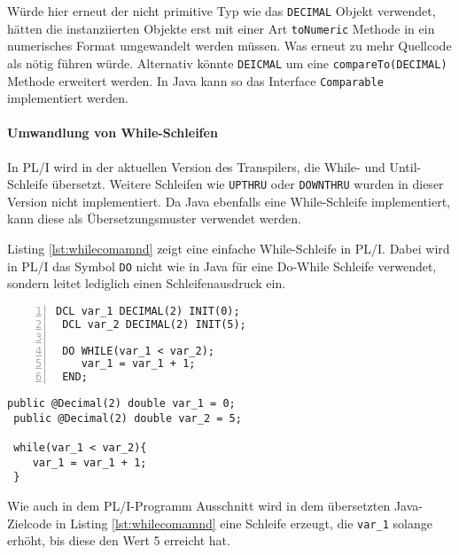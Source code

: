 Würde hier erneut der nicht primitive Typ wie das \verb+DECIMAL+ Objekt verwendet, hätten die instanziierten Objekte erst mit einer Art \verb+toNumeric+ Methode in ein numerisches Format umgewandelt werden müssen. Was erneut zu mehr Quellcode als nötig führen würde. Alternativ könnte \verb+DEICMAL+ um eine \verb+compareTo(DECIMAL)+ Methode erweitert werden. In Java kann so das Interface \verb+Comparable+ implementiert werden. 

\paragraph*{Umwandlung von While-Schleifen}
In PL/I wird in der aktuellen Version des Transpilers, die  While- und Until-Schleife übersetzt.
Weitere Schleifen wie \verb+UPTHRU+ oder \verb+DOWNTHRU+ wurden in dieser Version nicht implementiert.
Da Java ebenfalls eine While-Schleife implementiert, kann diese als Übersetzungsmuster verwendet werden. 


Listing \ref{lst:whilecomamnd} zeigt eine einfache While-Schleife in PL/I.
Dabei wird in PL/I das Symbol \verb+DO+ nicht wie in Java für eine Do-While
Schleife verwendet, sondern leitet lediglich einen Schleifenausdruck ein.

\begin{minipage}[b]{0.48\linewidth}
	\centering
	\lstset{language=PL/I,label=SliceExaple}
	\begin{lstlisting}[frame=single, numbers=left, mathescape,%
		caption={Transformation While-Schleife}, label={lst:whilecomamnd}, basicstyle=\fontsize{9}{13}\selectfont\ttfamily]
 DCL var_1 DECIMAL(2) INIT(0);
 DCL var_2 DECIMAL(2) INIT(5);
		
 DO WHILE(var_1 < var_2);
 	var_1 = var_1 + 1;
 END;
	\end{lstlisting}
\end{minipage}
\hspace{0.5cm}
\begin{minipage}[b]{0.48\linewidth}
	\centering
	\lstset{language=Java,label=SliceExaple}
	\begin{lstlisting}[frame=single, mathescape,%
		title={" "}, basicstyle=\fontsize{9}{13}\selectfont\ttfamily]
 public @Decimal(2) double var_1 = 0;
 public @Decimal(2) double var_2 = 5;
		
 while(var_1 < var_2){
 	var_1 = var_1 + 1;
 }
	\end{lstlisting}
\end{minipage} 

Wie auch in dem PL/I-Programm Ausschnitt wird in dem übersetzten Java-Zielcode in Listing \ref{lst:whilecomamnd} eine Schleife erzeugt, die \verb+var_1+ solange erhöht, bis diese den Wert 5 erreicht hat.

